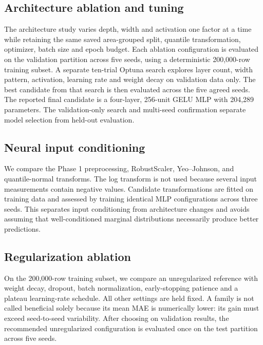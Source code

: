 \documentclass[conference]{IEEEtran}
\begin{document}
\subsection{Architecture ablation and tuning}
The architecture study varies depth, width and activation one factor at a time while retaining the same saved area-grouped split, quantile transformation, optimizer, batch size and epoch budget. Each ablation configuration is evaluated on the validation partition across five seeds, using a deterministic 200,000-row training subset. A separate ten-trial Optuna search explores layer count, width pattern, activation, learning rate and weight decay on validation data only. The best candidate from that search is then evaluated across the five agreed seeds. The reported final candidate is a four-layer, 256-unit GELU MLP with 204,289 parameters. The validation-only search and multi-seed confirmation separate model selection from held-out evaluation.

\subsection{Neural input conditioning}
We compare the Phase 1 preprocessing, RobustScaler, Yeo--Johnson, and quantile-normal transforms. The log transform is not used because several input measurements contain negative values. Candidate transformations are fitted on training data and assessed by training identical MLP configurations across three seeds. This separates input conditioning from architecture changes and avoids assuming that well-conditioned marginal distributions necessarily produce better predictions.

\subsection{Regularization ablation}
On the 200,000-row training subset, we compare an unregularized reference with weight decay, dropout, batch normalization, early-stopping patience and a plateau learning-rate schedule. All other settings are held fixed. A family is not called beneficial solely because its mean MAE is numerically lower: its gain must exceed seed-to-seed variability. After choosing on validation results, the recommended unregularized configuration is evaluated once on the test partition across five seeds.
\end{document}
